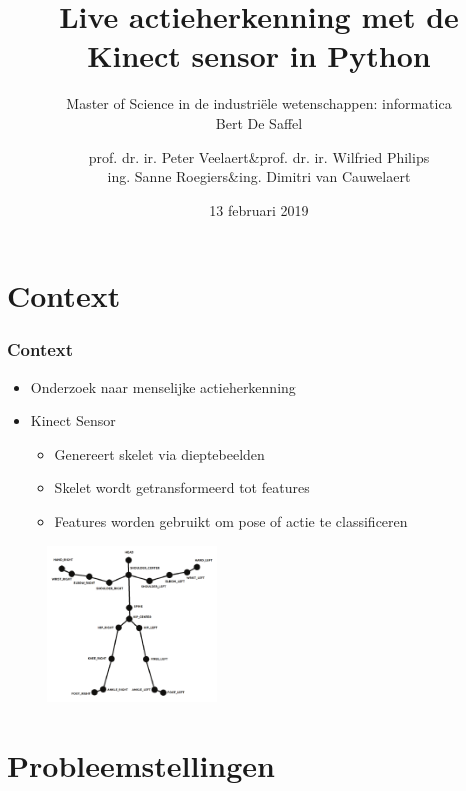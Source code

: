 \documentclass[]{beamer}
\begin{document}
	\title[Actieherkenning met de Kinect sensor]{Live actieherkenning met de Kinect sensor in Python}
	\author[Bert De Saffel]{
				\begin{tabular}{rcr}
				prof. dr. ir. Peter Veelaert &\&& prof. dr. ir. Wilfried Philips \\
				ing. Sanne Roegiers &\&& ing. Dimitri van Cauwelaert
				\end{tabular}
	}
	
	\subtitle{Master of Science in de industriële wetenschappen: informatica \\ \vspace{0.2cm} Bert De Saffel}
	\date{13 februari 2019}
	\frame{\titlepage}

	\section{Context}
	
	
	\begin{frame}
	\frametitle{Context}
		\begin{itemize}
			\item<1- > Onderzoek naar menselijke actieherkenning
			\item<2- > Kinect Sensor 
			\begin{itemize}
				\item<2- > Genereert skelet via dieptebeelden
				\item<2- > Skelet wordt getransformeerd tot features
				\item<2- > Features worden gebruikt om pose of actie te classificeren
			\end{itemize}
		\end{itemize}
		\begin{figure}
			\includegraphics[width=0.4\textwidth]{skeleton}
		\end{figure}
	\end{frame}

	
	\section{Probleemstellingen}
\end{document}
